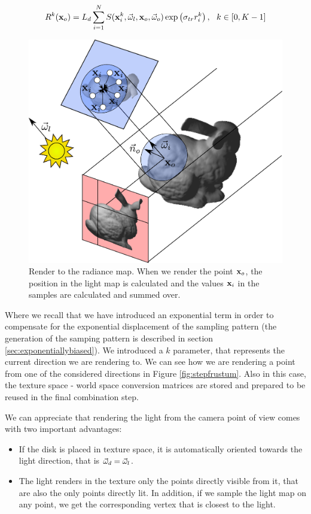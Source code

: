 $$
R^{k}(\mathbf{x}_o) = L_d \sum_{i = 1}^N S(\mathbf{x}^{k}_i, \vec{\omega}_l, \mathbf{x}_o, \vec{\omega}_o) \exp\left(\sigma_{tr} r^{k}_i\right), \ \ k \in [0,K-1] 
\label{eq:evolution_step}
$$

\begin{figure}[!ht]
\centering
\includegraphics[width=0.9 \linewidth]{images/method/step2_improved.pdf}
\caption{Render to the radiance map. When we render the point $\mathbf{x}_o$, the position in the light map is calculated and the values $\mathbf{x}_i$ in the samples are calculated and summed over.}
\label{fig:step2}
\end{figure} 

Where we recall that we have introduced an exponential term in order to compensate for the exponential displacement of the sampling pattern (the generation of the samping pattern is described in section \ref{sec:exponentiallybiased}). We introduced a $k$ parameter, that represents the current direction we are rendering to. We can see how we are rendering a point from one of the considered directions in Figure \ref{fig:stepfrustum}. Also in this case, the texture space - world space conversion matrices are stored and prepared to be reused in the final combination step. 

We can appreciate that rendering the light from the camera point of view comes with two important advantages:

\begin{itemize}
	\item If the disk is placed in texture space, it is automatically oriented towards the light direction, that is $\vec{\omega}_d = \vec{\omega}_l$.
	\item The light renders in the texture only the points directly visible from it, that are also the only points directly lit. In addition, if we sample the light map on any point, we get the corresponding vertex that is closest to the light.
\end{itemize}

